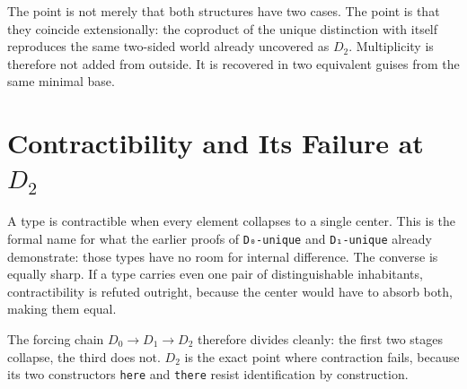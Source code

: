 \documentclass[11pt,a4paper]{book}
\begin{document}
The point is not merely that both structures have two cases. The point is that they coincide extensionally: the coproduct of the unique distinction with itself reproduces the same two-sided world already uncovered as $D_2$. Multiplicity is therefore not added from outside. It is recovered in two equivalent guises from the same minimal base.

\begin{center}
\end{center}

\section{Contractibility and Its Failure at $D_2$}

A type is contractible when every element collapses to a single center. This is the formal name for what the earlier proofs of \texttt{D₀-unique} and \texttt{D₁-unique} already demonstrate: those types have no room for internal difference. The converse is equally sharp. If a type carries even one pair of distinguishable inhabitants, contractibility is refuted outright, because the center would have to absorb both, making them equal.

The forcing chain $D_0 \to D_1 \to D_2$ therefore divides cleanly: the first two stages collapse, the third does not. $D_2$ is the exact point where contraction fails, because its two constructors \texttt{here} and \texttt{there} resist identification by construction.
\end{document}
